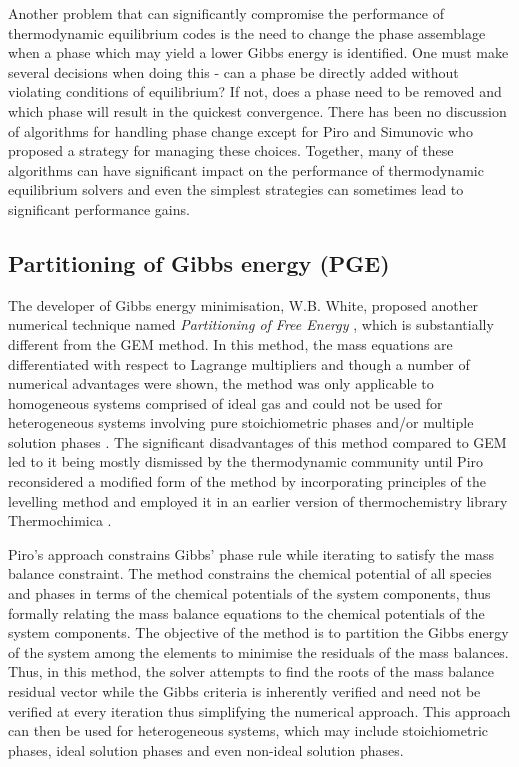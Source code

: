     Another problem that can significantly compromise the performance of thermodynamic equilibrium codes is the need to change the phase assemblage when a phase which may yield a lower Gibbs energy is identified. 
    One must make several decisions when doing this - can a phase be directly added without violating conditions of equilibrium? If not, does a phase need to be removed and which phase will result in the quickest convergence. There has been no discussion of algorithms for handling phase change except for Piro and Simunovic \cite{Piro12a} who proposed a strategy for managing these choices.  Together, many of these algorithms can have significant impact on the performance of thermodynamic equilibrium solvers and even the simplest strategies can sometimes lead to significant performance gains.

	\subsection{Partitioning of Gibbs energy (PGE)}
	The developer of Gibbs energy minimisation, W.B. White, proposed another numerical technique named \emph{Partitioning of Free Energy}  \cite{White67}, which is substantially different from the GEM method. In this method, the mass equations are differentiated with respect to Lagrange multipliers and though a number of numerical advantages were shown, the method was only applicable to homogeneous systems comprised of ideal gas and could not be used for heterogeneous systems involving pure stoichiometric phases and/or multiple solution phases \cite{White67,vanZeggeren11}. The significant disadvantages of this method compared to GEM led to it being mostly dismissed by the thermodynamic community until Piro \cite{Piro11b} reconsidered a modified form of the method by incorporating principles of the levelling method and employed it in an earlier version  of thermochemistry library {Thermochimica} \cite{Piro13}.

	Piro's approach \cite{Piro13} constrains  Gibbs' phase rule  while iterating to satisfy the mass balance constraint. The method constrains the chemical potential of all species and phases in terms of the chemical potentials of the system components, thus formally relating the mass balance equations to the chemical potentials of the system components. The objective of the method is to partition the Gibbs energy of the system among the elements to minimise the residuals of the mass balances. Thus, in this method, the solver attempts to find the roots of the mass balance residual vector while the Gibbs criteria is inherently verified and need not be verified at every iteration thus simplifying the numerical approach. This approach can then be used for heterogeneous systems, which may include stoichiometric phases, ideal solution phases and even non-ideal solution phases.

